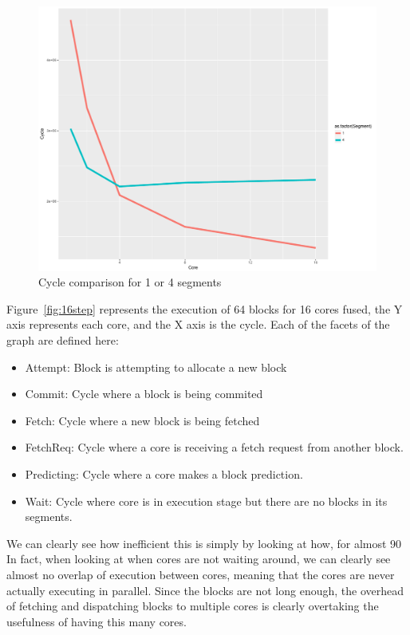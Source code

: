 \begin{figure}
\center
  \includegraphics[width=1\textwidth]{chapter3/graphics/twolf_perf.pdf}
  \caption{Cycle comparison for 1 or 4 segments}\label{fig:4v1}
\end{figure}
Figure~\ref{fig:16step} represents the execution of 64 blocks for 16 cores fused, the Y axis represents each core, and the X axis is the cycle.
Each of the facets of the graph are defined here:
\begin{itemize}
\item Attempt: Block is attempting to allocate a new block
\item Commit:  Cycle where a block is being commited
\item Fetch: Cycle where a new block is being fetched
\item FetchReq: Cycle where a core is receiving a fetch request from another block.
\item Predicting: Cycle where a core makes a block prediction.
\item Wait: Cycle where core is in execution stage but there are no blocks in its segments.
\end{itemize}

We can clearly see how inefficient this is simply by looking at how, for almost 90%
In fact, when looking at when cores are not waiting around, we can clearly see almost no overlap of execution between cores, meaning that the cores are never actually executing in parallel.
Since the blocks are not long enough, the overhead of fetching and dispatching blocks to multiple cores is clearly overtaking the usefulness of having this many cores.

